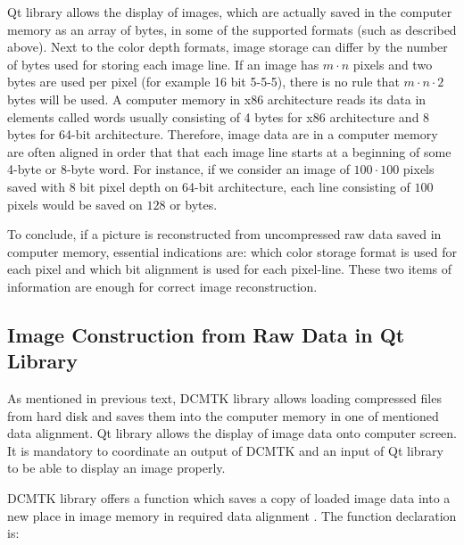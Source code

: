 
Qt library allows the display of images, which are actually saved in the computer memory as an array of bytes, in some of the supported formats (such as described above). Next to the color depth formats, image storage can differ by the number of bytes used for storing each image line. If an image has $m \cdot n$ pixels and two bytes are used per pixel (for example 16 bit 5-5-5), there is no rule that $m \cdot n \cdot 2$ bytes will be used. A computer memory in x86 architecture reads its data in elements called words usually consisting of 4 bytes for x86 architecture and 8 bytes for 64-bit architecture. Therefore, image data are in a computer memory are often aligned in order that that each image line starts at a beginning of some 4-byte or 8-byte word\cite{memoryalignment}. For instance, if we consider an image of $100 \cdot 100$ pixels saved with 8 bit pixel depth on 64-bit architecture, each line consisting of $100$ pixels would be saved on $128$ or bytes.

To conclude, if a picture is reconstructed from uncompressed raw data saved in computer memory, essential indications are: which color storage format is used for each pixel and which bit alignment is used for each pixel-line. These two items of information are enough for correct image reconstruction.

\subsection{Image Construction from Raw Data in Qt Library}
As mentioned in previous text, DCMTK library allows loading compressed files from hard disk and saves them into the computer memory in one of mentioned data alignment. Qt library allows the display of image data onto computer screen. It is mandatory to coordinate an output of DCMTK and an input of Qt library to be able to display an image properly.

DCMTK library offers a function which saves a copy of loaded image data into a new place in image memory in required data alignment \cite{dcmtksupport}. The function declaration is:


